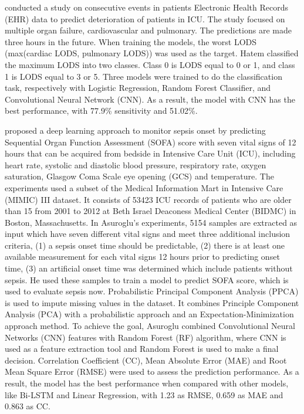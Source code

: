 \documentclass[12pt,a4paper,english
]{tunithesis}
\begin{document}
\textcite{hatem2018} conducted a study on consecutive events in patients Electronic Health Records
(EHR) data to predict deterioration of patients in ICU. The study focused on multiple organ failure, cardiovascular and pulmonary. The predictions are made three hours in the future. When training the models, the worst LODS (max(cardiac LODS, pulmonary LODS)) was used as the target. Hatem classified the maximum LODS into two classes. Class 0 is LODS equal to 0 or 1, and class 1 is LODS equal to 3 or 5. Three models were trained to do the classification task, respectively with Logistic Regression, Random Forest Classifier, and Convolutional Neural Network (CNN). As a result, the model with CNN has the best performance, with 77.9\% sensitivity and 51.02\%. 

\textcite{asuroglu2021} proposed a deep learning approach to monitor sepsis onset by predicting Sequential Organ Function Assessment (SOFA) score with seven vital signs of 12 hours that can be acquired from bedside in Intensive Care Unit (ICU), including heart rate, systolic and diastolic blood pressure, respiratory rate, oxygen saturation, Glasgow Coma Scale eye opening (GCS) and temperature. The experiments used a subset of the Medical Information Mart in Intensive Care (MIMIC) III dataset. It consists of 53423 ICU records of patients who are older than 15 from 2001 to 2012 at Beth Israel Deaconess Medical Center (BIDMC) in Boston, Massachusetts. In Asuroglu's experiments, 5154 samples are extracted as input which have seven different vital signs and meet three additional inclusion criteria, (1) a sepsis onset time should be predictable, (2) there is at least one available measurement for each vital signs 12 hours prior to predicting onset time, (3) an artificial onset time was determined which include patients without sepsis. He used these samples to train a model to predict SOFA score, which is used to evaluate sepsis now. Probabilistic Principal Component Analysis (PPCA) is used to impute missing values in the dataset. It combines Principle Component Analysis (PCA) with a probabilistic approach and an Expectation-Minimization approach method. To achieve the goal, Asuroglu combined Convolutional Neural Networks (CNN) features with Random Forest (RF) algorithm, where CNN is used as a feature extraction tool and Random Forest is used to make a final decision. Correlation Coefficient (CC), Mean Absolute Error (MAE) and Root Mean Square Error (RMSE) were used to assess the prediction performance. As a result, the model has the best performance when compared with other models, like Bi-LSTM and Linear Regression, with 1.23 as RMSE, 0.659 as MAE and 0.863 as CC.
\end{document}
